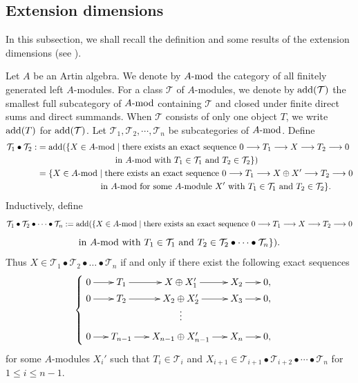 \documentclass[12pt]{article}
\numberwithin{equation}{section}
\theoremstyle{definition}
\newcommand{\add}{{\rm add}}
\newcommand{\T}{{\mathcal T}}
\newcommand{\modcat}{\ensuremath{\mbox{{\rm -mod}}}}
\newcommand{\lra}{\longrightarrow}
\begin{document}
\subsection{Extension dimensions}
In this subsection, we shall recall the definition and some results of the extension dimensions (see \cite{b08,zheng2020}).

Let $A$ be an Artin algebra. We denote by $A\modcat$ the category of all finitely generated left $A$-modules. For a class $\T$ of $A$-modules, we denote by $\add(\T)$ the smallest full subcategory of $A\modcat$ containing $\T$ and closed under finite direct sums and direct summands. When $\T$ consists of only one object $T$, we write $\add(T)$ for $\add(\T)$.
Let $\T_1,\T_2,\cdots,\T_n$ be subcategories of $A\modcat$. Define
\begin{align*}
\T_1\bullet \T_2
:&=\add(\{X\in A\modcat \mid \mbox{there exists an exact sequence } 0\lra T_1\lra  X \lra T_2\lra 0\\
&\qquad\qquad\qquad\qquad\quad\mbox{in } A\modcat \mbox{ with }T_1 \in \T_1\mbox{ and }T_2 \in \T_2\})\\
&=\{X\in A\modcat \mid \mbox{there exists an exact sequence } 0\lra T_1\lra  X\oplus X' \lra T_2\lra 0\\
&\qquad\qquad\qquad\quad\mbox{ in } A\modcat \mbox{ for some } A\mbox{-module } X' \mbox{ with }T_1 \in \T_1\mbox{ and }T_2 \in \T_2\}.
\end{align*}
Inductively, define
$$\T_{1}\bullet  \T_{2}\bullet \dots \bullet\T_{n}:=\add(\{X\in A\modcat \mid \mbox{there exists an exact sequence }
0\lra T_1\lra  X \lra T_2\lra 0$$
$$\mbox{in } A\modcat \mbox{ with }T_1 \in \T_1\mbox{ and }T_2 \in \T_{2}\bullet \dots \bullet\T_{n}\}).$$
Thus $X\in \T_{1}\bullet  \T_{2}\bullet \dots \bullet\T_{n}$ if and only if there exist the following exact sequences
\begin{equation*}
\begin{cases}
\xymatrix@C=1.5em@R=0.1em{
0\ar[r]& T_1 \ar[r]& X\oplus X_1' \ar[r]& X_2 \ar[r]& 0,\\
0\ar[r]& T_2 \ar[r]& X_2\oplus X_2' \ar[r]& X_3 \ar[r]& 0,\\
&&\vdots&&\\
0\ar[r]& T_{n-1} \ar[r]& X_{n-1}\oplus X_{n-1}' \ar[r]& X_n \ar[r]& 0,}
\end{cases}
\end{equation*}
for some $A$-modules $X_i'$ such that $T_i\in \T_i$ and $X_{i+1}\in \T_{i+1}\bullet \T_{i+2}\bullet \cdots \bullet \T_n$ for $1\le i\le n-1$.
\end{document}
